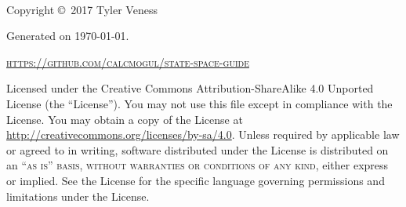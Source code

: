 \begingroup
\thispagestyle{empty}
\vfill
\endgroup

\newpage
~\vfill
\thispagestyle{empty}

Copyright \copyright\ 2017 Tyler Veness

Generated on \monthdayyeardate\today.

\textsc{\url{https://github.com/calcmogul/state-space-guide}}

Licensed under the Creative Commons Attribution-ShareAlike 4.0 Unported License
(the ``License''). You may not use this file except in compliance with the
License. You may obtain a copy of the License at
\url{http://creativecommons.org/licenses/by-sa/4.0}. Unless required by
applicable law or agreed to in writing, software distributed under the License
is distributed on an \textsc{``as is'' basis, without warranties or conditions
of any kind}, either express or implied. See the License for the specific
language governing permissions and limitations under the License.



\pagestyle{empty} %

\tableofcontents %

\cleardoublepage

\pagestyle{fancy} %

